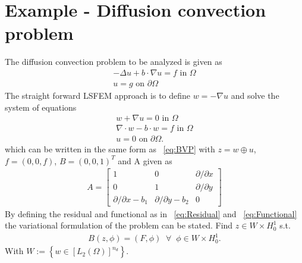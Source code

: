 \section{Example - Diffusion convection problem}
%
The diffusion convection problem to be analyzed is given as 
\begin{align}
	-\Delta u + b \cdot \nabla u = f \text{ in } \Omega \\
	u = g \text{ on } \partial \Omega
	\label{eq:DiffTrans}
\end{align}
The straight forward LSFEM approach is to define $w = -\nabla u$ and solve the system of equations 
\begin{align}
	w + \nabla u = 0 \text{ in } \Omega \\
	\nabla \cdot w - b \cdot w = f \text{ in } \Omega \\
	u = 0 \text{ on } \partial \Omega.
	\label{eq:DiffTransSystem}
\end{align}
which can be written in the same form as ~\ref{eq:BVP} with $ z = w \oplus u $, $f = (0,0,f)$, $B = (0,0,1)^T $ and A given as 
\begin{align}
	A =
	\begin{bmatrix}
		1 & 0 & \partial / \partial x  \\
		0 & 1 & \partial / \partial y  \\
		\partial / \partial x - b_1 & \partial/ \partial y -b_2 & 0
	\end{bmatrix}
	\label{eq:AmatrixDiff}
\end{align}
By defining the residual and functional as in ~\ref{eq:Residual} and ~\ref{eq:Functional} the variational formulation of the problem can be stated. Find $ z \in W \times H_0^1$ s.t.
\begin{align}
	B(z,\phi) = (F,\phi) \;\; \forall \;\; \phi \in W \times H_0^1.
	\label{eq:VariationalFormulation}
\end{align}
With $W := \left\{ w \in \left[L_2(\Omega)\right]^{n_d}\right\}$.

